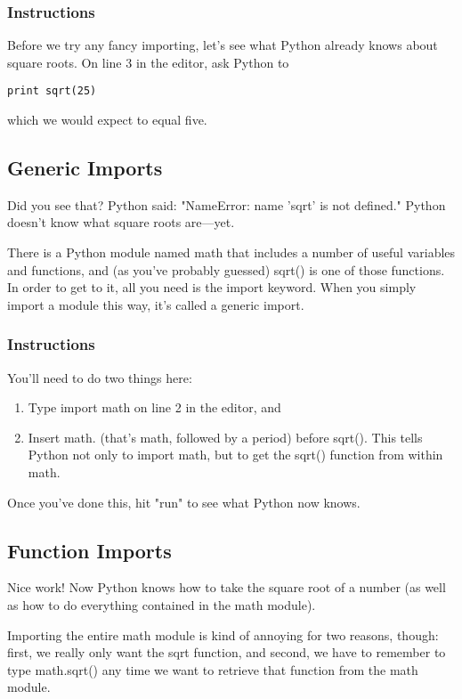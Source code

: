 \documentclass[12pt,a4paper,final,twoside,onecolumn,titlepage]{book}
\begin{document}
\subsubsection{Instructions}

Before we try any fancy importing, let's see what Python already knows about square roots. On line 3 in the editor, ask Python to
\begin{lstlisting}
print sqrt(25)
\end{lstlisting}
which we would expect to equal five.

\subsection{Generic Imports}

Did you see that? Python said: "NameError: name 'sqrt' is not defined." Python doesn't know what square roots are—yet.

There is a Python module named math that includes a number of useful variables and functions, and (as you've probably guessed) sqrt() is one of those functions. In order to get to it, all you need is the import keyword. When you simply import a module this way, it's called a generic import.

\subsubsection{Instructions}

You'll need to do two things here:
\begin{enumerate}
\item    Type import math on line 2 in the editor, and
\item    Insert math. (that's math, followed by a period) before sqrt(). This tells Python not only to import math, but to get the sqrt() function from within math.
\end{enumerate}
Once you've done this, hit "run" to see what Python now knows.

\subsection{Function Imports}

Nice work! Now Python knows how to take the square root of a number (as well as how to do everything contained in the math module).

Importing the entire math module is kind of annoying for two reasons, though: first, we really only want the sqrt function, and second, we have to remember to type math.sqrt() any time we want to retrieve that function from the math module.
\end{document}

